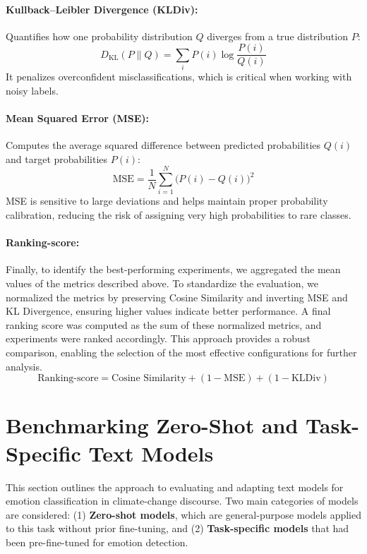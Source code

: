 \paragraph{Kullback--Leibler Divergence (KLDiv):}  
Quantifies how one probability distribution $Q$ diverges from a true distribution $P$:
\begin{equation}
    D_{\mathrm{KL}}(P \parallel Q) = \sum_{i} P(i) \log \frac{P(i)}{Q(i)}
\end{equation}
It penalizes overconfident misclassifications, which is critical when working with noisy labels.

\paragraph{Mean Squared Error (MSE):}  
Computes the average squared difference between predicted probabilities $Q(i)$ and target probabilities $P(i)$:
\begin{equation}
    \mathrm{MSE} = \frac{1}{N} \sum_{i=1}^{N} \bigl(P(i) - Q(i)\bigr)^2
\end{equation}
MSE is sensitive to large deviations and helps maintain proper probability calibration, reducing the risk of assigning very high probabilities to rare classes.

\paragraph{Ranking-score:}
Finally, to identify the best-performing experiments, we aggregated the mean values of the metrics described above. To standardize the evaluation, we normalized the metrics by preserving Cosine Similarity and inverting MSE and KL Divergence, ensuring higher values indicate better performance. A final ranking score was computed as the sum of these normalized metrics, and experiments were ranked accordingly. This approach provides a robust comparison, enabling the selection of the most effective configurations for further analysis.
\begin{equation}
\text{Ranking-score} = \text{Cosine Similarity} + (1 - \text{MSE}) + (1 - \text{KLDiv})
\end{equation}


\section{Benchmarking Zero-Shot and Task-Specific Text Models}

This section outlines the approach to evaluating and adapting text models for emotion classification in climate-change discourse. Two main categories of models are considered: (1) \textbf{Zero-shot models}, which are general-purpose models applied to this task without prior fine-tuning, and (2) \textbf{Task-specific models} that had been pre-fine-tuned for emotion detection.

